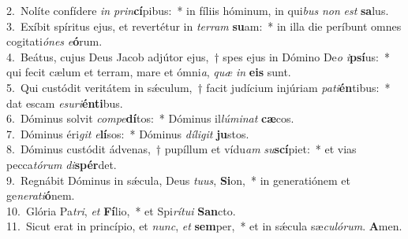 {2.~}Nolíte confídere \textit{in} \textit{prin}\textbf{cí}pibus:~* in fíliis hóminum, in qui\textit{bus} \textit{non} \textit{est} \textbf{sa}lus.\\
{3.~}Exíbit spíritus ejus, et revertétur in \textit{ter}\textit{ram} \textbf{su}am:~* in illa die períbunt omnes cogitati\textit{ó}\textit{nes} \textit{e}\textbf{ó}rum.\\
{4.~}Beátus, cujus Deus Jacob adjútor ejus,~† spes ejus in Dómino De\textit{o} \textit{i}\textbf{psí}us:~* qui fecit cælum et terram, mare et ómni\textit{a}, \textit{quæ} \textit{in} \textbf{e}\textbf{is} sunt.\\
{5.~}Qui custódit veritátem in sǽculum,~† facit judícium injúriam \textit{pa}\textit{ti}\textbf{én}tibus:~* dat escam \textit{e}\textit{su}\textit{ri}\textbf{én}\textbf{ti}bus.\\
{6.~}Dóminus solvit \textit{com}\textit{pe}\textbf{dí}tos:~* Dóminus il\textit{lú}\textit{mi}\textit{nat} \textbf{cæ}cos.\\
{7.~}Dóminus éri\textit{git} \textit{e}\textbf{lí}sos:~* Dóminus \textit{dí}\textit{li}\textit{git} \textbf{ju}stos.\\
{8.~}Dóminus custódit ádvenas,~† pupíllum et vídu\textit{am} \textit{su}\textbf{scí}piet:~* et vias pecca\textit{tó}\textit{rum} \textit{di}\textbf{spér}det.\\
{9.~}Regnábit Dóminus in sǽcula, Deus \textit{tu}\textit{us}, \textbf{Si}on,~* in generatiónem et ge\textit{ne}\textit{ra}\textit{ti}\textbf{ó}nem.\\
{10.~}Glória Pa\textit{tri}, \textit{et} \textbf{Fí}lio,~* et Spi\textit{rí}\textit{tu}\textit{i} \textbf{San}cto.\\
{11.~}Sicut erat in princípio, et \textit{nunc}, \textit{et} \textbf{sem}per,~* et in sǽcula sæ\textit{cu}\textit{ló}\textit{rum}. \textbf{A}men.\\
